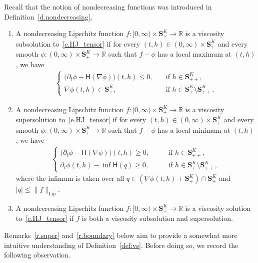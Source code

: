 \documentclass[AHL,Unicode,longabstracts,published]{cedram}
\newcommand{\R}{\mathbb{R}}
\renewcommand{\S}{\mathbf{S}}
\newcommand{\Lip}{\mathrm{Lip}}
\renewcommand{\H}{\mathsf{H}}
\renewcommand{\leq}{\leqslant}
\renewcommand{\geq}{\geqslant}
\begin{document}
Recall that the notion of nondecreasing functions was introduced in Definition~\ref{d.nondecreasing}.

\pagebreak
\begin{defi}\label{def:vs}
\leavevmode
\begin{enumerate}
\item \label{defi4.1.1} A nondecreasing Lipschitz function $f:[0,\infty)\times \S^K_+\to \R$ is a viscosity subsolution to~\eqref{e.HJ_tensor} if for every $(t,h) \in (0,\infty)\times \S^K_+$ and every smooth $\phi:(0,\infty)\times \S^K_+ \to \R$ such that $f-\phi$ has a local maximum at $(t,h)$, we have
\begin{align*}
\begin{cases}
\big(\partial_t \phi - \H\left(\nabla\phi\right)\big)(t,h)\leq 0, \quad &\text{if }h\in \S^K_{++},\\
\nabla\phi(t,h) \in\S^K_+, \quad &\text{if }h\in \S^K_+\setminus\S^K_{++}.
\end{cases}
\end{align*}


\item \label{item:vs_2}
A nondecreasing Lipschitz function $f:[0,\infty)\times \S^K_+\to \R$ is a viscosity supersolution to~\eqref{e.HJ_tensor} if for every $(t,h) \in (0,\infty)\times \S^K_+$ and every smooth $\phi:(0,\infty)\times \S^K_+ \to \R$ such that $f-\phi$ has a local minimum at $(t,h)$, we have
\begin{align*}
\begin{cases}
\big(\partial_t \phi - \H(\nabla\phi)\big)(t,h)\geq 0, \quad &\text{if }h\in \S^K_{++},\\
\partial_t \phi (t,h) - \inf \H(q)\geq 0,\qquad &\text{if }h\in \S^K_+\setminus\S^K_{++},
\end{cases}
\end{align*}
where the infimum is taken over all $q\in (\nabla \phi(t,h) +\S^K_+)\cap \S^K_+ $ and $|q|\leq \|f\|_{\Lip}$.



\item\label{defi4.1.3} A nondecreasing Lipschitz function $f:[0,\infty)\times \S^K_+\to \R$ is a viscosity solution to~\eqref{e.HJ_tensor} if $f$ is both a viscosity subsolution and supersolution.
\end{enumerate}
\end{defi}

Remarks~\ref{r.super} and~\ref{r.boundary} below aim to provide a somewhat more intuitive understanding of Definition~\ref{def:vs}. Before doing so, we record the following observation.
\end{document}
